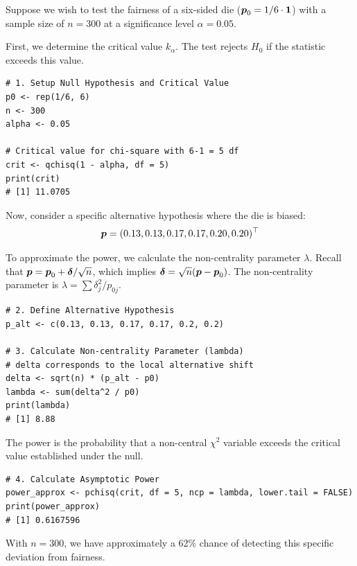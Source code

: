 \begin{ex}[Ferguson 1996]
Suppose we wish to test the fairness of a six-sided die ($\boldsymbol{p}_0 = 1/6 \cdot \boldsymbol{1}$) with a sample size of $n=300$ at a significance level $\alpha = 0.05$.

First, we determine the critical value $k_\alpha$. The test rejects $H_0$ if the statistic exceeds this value.

\begin{verbatim}
# 1. Setup Null Hypothesis and Critical Value
p0 <- rep(1/6, 6)
n <- 300
alpha <- 0.05

# Critical value for chi-square with 6-1 = 5 df
crit <- qchisq(1 - alpha, df = 5)
print(crit)
# [1] 11.0705
\end{verbatim}

Now, consider a specific alternative hypothesis where the die is biased:
\[ \boldsymbol{p} = (0.13, 0.13, 0.17, 0.17, 0.20, 0.20)^\top \]

To approximate the power, we calculate the non-centrality parameter $\lambda$. Recall that $\boldsymbol{p} = \boldsymbol{p}_0 + \boldsymbol{\delta}/\sqrt{n}$, which implies $\boldsymbol{\delta} = \sqrt{n}(\boldsymbol{p} - \boldsymbol{p}_0)$.
The non-centrality parameter is $\lambda = \sum \delta_j^2 / p_{0j}$.

\begin{verbatim}
# 2. Define Alternative Hypothesis
p_alt <- c(0.13, 0.13, 0.17, 0.17, 0.2, 0.2)

# 3. Calculate Non-centrality Parameter (lambda)
# delta corresponds to the local alternative shift
delta <- sqrt(n) * (p_alt - p0)
lambda <- sum(delta^2 / p0)
print(lambda)
# [1] 8.88
\end{verbatim}



The power is the probability that a non-central $\chi^2$ variable exceeds the critical value established under the null.

\begin{verbatim}
# 4. Calculate Asymptotic Power
power_approx <- pchisq(crit, df = 5, ncp = lambda, lower.tail = FALSE)
print(power_approx)
# [1] 0.6167596
\end{verbatim}

With $n=300$, we have approximately a 62\% chance of detecting this specific deviation from fairness.
\end{ex}

